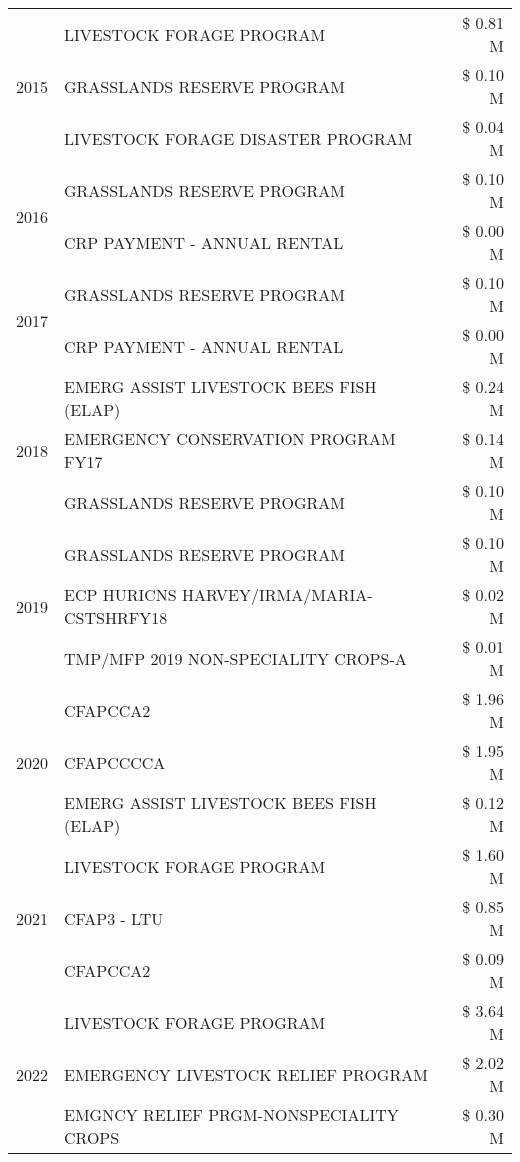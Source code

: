 \begin{tabular}{llr}
\cline{1-3}
\multirow[t]{3}{*}{2015} & LIVESTOCK FORAGE PROGRAM & \$ 0.81 M \\
 & GRASSLANDS RESERVE PROGRAM & \$ 0.10 M \\
 & LIVESTOCK FORAGE DISASTER PROGRAM & \$ 0.04 M \\
\cline{1-3}
\multirow[t]{2}{*}{2016} & GRASSLANDS RESERVE PROGRAM & \$ 0.10 M \\
 & CRP PAYMENT - ANNUAL RENTAL & \$ 0.00 M \\
\cline{1-3}
\multirow[t]{2}{*}{2017} & GRASSLANDS RESERVE PROGRAM & \$ 0.10 M \\
 & CRP PAYMENT - ANNUAL RENTAL & \$ 0.00 M \\
\cline{1-3}
\multirow[t]{3}{*}{2018} & EMERG ASSIST LIVESTOCK BEES FISH (ELAP) & \$ 0.24 M \\
 & EMERGENCY CONSERVATION PROGRAM FY17 & \$ 0.14 M \\
 & GRASSLANDS RESERVE PROGRAM & \$ 0.10 M \\
\cline{1-3}
\multirow[t]{3}{*}{2019} & GRASSLANDS RESERVE PROGRAM & \$ 0.10 M \\
 & ECP HURICNS HARVEY/IRMA/MARIA-CSTSHRFY18 & \$ 0.02 M \\
 & TMP/MFP 2019 NON-SPECIALITY CROPS-A & \$ 0.01 M \\
\cline{1-3}
\multirow[t]{3}{*}{2020} & CFAPCCA2 & \$ 1.96 M \\
 & CFAPCCCCA & \$ 1.95 M \\
 & EMERG ASSIST LIVESTOCK BEES FISH (ELAP) & \$ 0.12 M \\
\cline{1-3}
\multirow[t]{3}{*}{2021} & LIVESTOCK FORAGE PROGRAM & \$ 1.60 M \\
 & CFAP3 - LTU & \$ 0.85 M \\
 & CFAPCCA2 & \$ 0.09 M \\
\cline{1-3}
\multirow[t]{3}{*}{2022} & LIVESTOCK FORAGE PROGRAM & \$ 3.64 M \\
 & EMERGENCY LIVESTOCK RELIEF PROGRAM & \$ 2.02 M \\
 & EMGNCY RELIEF PRGM-NONSPECIALITY CROPS & \$ 0.30 M \\
\cline{1-3}
\bottomrule
\end{tabular}
